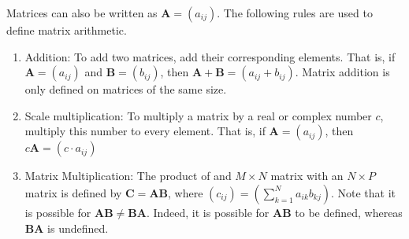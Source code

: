 \documentclass[crop=false,class=book,oneside]{standalone}
\begin{document}
        Matrices can also be written as $\mathbf{A}=(a_{ij})$.
        The following rules are used to
        define matrix arithmetic.
        \begin{enumerate}
            \item Addition: To add two matrices, add their
                corresponding elements. That is, if
                $\mathbf{A}=(a_{ij})$ and $\mathbf{B}=(b_{ij})$,
                then $\mathbf{A}+\mathbf{B}=(a_{ij}+b_{ij})$.
                Matrix addition is only defined on matrices of
                the same size.
            \item Scale multiplication: To multiply a
                matrix by a real or complex number $c$,
                multiply this number to every element. That is,
                if $\mathbf{A}=(a_{ij})$, then
                $c\mathbf{A}=({c}\cdot{a_{ij}})$
            \item Matrix Multiplication: The product of
                and ${M}\times{N}$ matrix with an
                ${N}\times{P}$ matrix is defined by
                $\mathbf{C}=\mathbf{A}\mathbf{B}$, where
                $(c_{ij})=(\sum_{k=1}^{N}a_{ik}b_{kj})$. Note
                that it is possible for
                $\mathbf{A}\mathbf{B}\ne\mathbf{B}\mathbf{A}$.
                Indeed, it is possible for
                $\mathbf{A}\mathbf{B}$ to be defined, whereas
                $\mathbf{B}\mathbf{A}$ is undefined.
        \end{enumerate}
\end{document}
